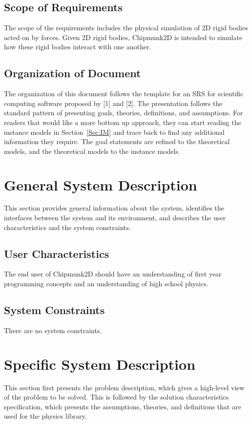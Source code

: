 \documentclass[12pt]{article}
\begin{document}
\subsection{Scope of Requirements}
\label{Sec:SoR}
The scope of the requirements includes the physical simulation of 2D rigid bodies acted on by forces. Given 2D rigid bodies, Chipmunk2D is intended to simulate how these rigid bodies interact with one another.
\subsection{Organization of Document}
\label{Sec:OoD}
The organization of this document follows the template for an SRS for scientific computing software proposed by [1] and [2]. The presentation follows the standard pattern of presenting goals, theories, definitions, and assumptions. For readers that would like a more bottom up approach, they can start reading the instance models in Section~\ref{Sec:IM} and trace back to find any additional information they require.
The goal statements are refined to the theoretical models, and the theoretical models to the instance models.
\section{General System Description}
\label{Sec:GSD}
This section provides general information about the system, identifies the interfaces between the system and its environment, and describes the user characteristics and the system constraints.
\subsection{User Characteristics}
\label{Sec:UC}
The end user of Chipmunk2D should have an understanding of first year programming concepts and an understanding of high school physics.
\subsection{System Constraints}
\label{Sec:SC}
There are no system constraints.
\section{Specific System Description}
\label{Sec:SSD}
This section first presents the problem description, which gives a high-level view of the problem to be solved. This is followed by the solution characteristics specification, which presents the assumptions, theories, and definitions that are used for the physics library.
\end{document}
